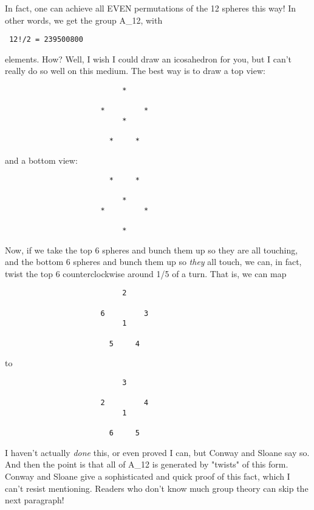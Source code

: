 In fact, one can achieve all EVEN permutations of the 12 spheres this
way!  In other words, we get the group A_{12}, with

\begin{verbatim}
 12!/2 = 239500800
\end{verbatim}
    

elements.  How?  Well, I wish I could draw an icosahedron for you, but I
can't really do so well on this medium.  The best way is to draw a top
view: 

 
\begin{verbatim}
                           *
 
                      *         *
                           *
                        
                        *     *
\end{verbatim}
    

and a bottom view:

\begin{verbatim}
                        *     *

                           *
                      *         *  
                    
                           *
\end{verbatim}
    
  
Now, if we take the top 6 spheres and bunch them up so they are all
touching, and the bottom 6 spheres and bunch them up so \emph{they} all
touch, we can, in fact, twist the top 6 counterclockwise around 1/5 of a
turn.  That is, we can map

\begin{verbatim}
                           2
 
                      6         3
                           1
                        
                        5     4
\end{verbatim}
    

to 


\begin{verbatim}
                           3
 
                      2         4
                           1
                        
                        6     5

\end{verbatim}
    


I haven't actually \emph{done} this, or even proved I can, but Conway
and Sloane say so.  And then the point is that all of A_{12} is
generated by "twists" of this form.  Conway and Sloane give a
sophisticated and quick proof of this fact, which I can't resist
mentioning.  Readers who don't know much group theory can skip the next
paragraph!


